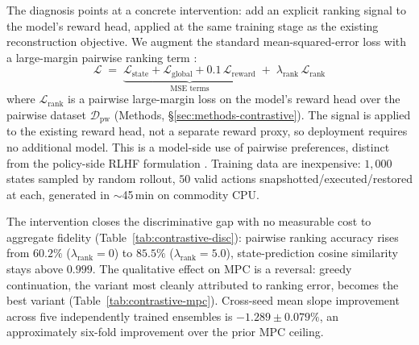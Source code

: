 \documentclass[11pt]{article}
\begin{document}
The diagnosis points at a concrete intervention: add an explicit ranking signal to the model's reward head, applied at the same training stage as the existing reconstruction objective. We augment the standard mean-squared-error loss with a large-margin pairwise ranking term \citep{herbrich2000large,joachims2002optimizing,burges2005learning,burges2010ranknet}:
\begin{equation}
\mathcal{L} \;=\; \underbrace{\mathcal{L}_{\text{state}} + \mathcal{L}_{\text{global}} + 0.1\,\mathcal{L}_{\text{reward}}}_{\text{MSE terms}} \;+\; \lambda_{\text{rank}}\,\mathcal{L}_{\text{rank}}
\end{equation}
where $\mathcal{L}_{\text{rank}}$ is a pairwise large-margin loss on the model's reward head over the pairwise dataset $\mathcal{D}_{\text{pw}}$ (Methods, \S\ref{sec:methods-contrastive}). The signal is applied to the existing reward head, not a separate reward proxy, so deployment requires no additional model. This is a model-side use of pairwise preferences, distinct from the policy-side RLHF formulation \citep{christiano2017deep,ouyang2022training}. Training data are inexpensive: $1{,}000$ states sampled by random rollout, $50$ valid actions snapshotted/executed/restored at each, generated in $\sim$45\,min on commodity CPU.

The intervention closes the discriminative gap with no measurable cost to aggregate fidelity (Table~\ref{tab:contrastive-disc}): pairwise ranking accuracy rises from $60.2\%$ ($\lambda_{\text{rank}}{=}0$) to $85.5\%$ ($\lambda_{\text{rank}}{=}5.0$), state-prediction cosine similarity stays above $0.999$. The qualitative effect on MPC is a reversal: greedy continuation, the variant most cleanly attributed to ranking error, becomes the best variant (Table~\ref{tab:contrastive-mpc}). Cross-seed mean slope improvement across five independently trained ensembles is $-1.289 \pm 0.079\%$, an approximately six-fold improvement over the prior MPC ceiling.
\end{document}
